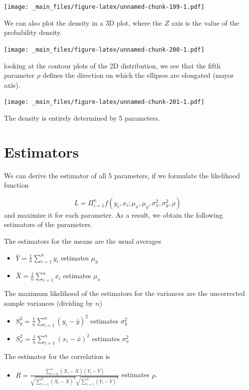 \documentclass[
]{book}
\providecommand{\tightlist}{%
  \setlength{\itemsep}{0pt}\setlength{\parskip}{0pt}}
\begin{document}
\texttt{[image: \_main\_files/figure-latex/unnamed-chunk-199-1.pdf]}

We can also plot the density in a 3D plot, where the \(Z\) axis is the value of the probability density.

\texttt{[image: \_main\_files/figure-latex/unnamed-chunk-200-1.pdf]}

looking at the contour plots of the 2D distribution, we see that the fifth parameter \(\rho\) defines the direction on which the ellipses are elongated (mayor axis).

\texttt{[image: \_main\_files/figure-latex/unnamed-chunk-201-1.pdf]}

The density is entirely determined by 5 parameters.

\hypertarget{estimators}{%
\section{Estimators}\label{estimators}}

We can derive the estimator of all 5 parameters, if we formulate the likelihood function

\[L=\Pi_{i=1}^n f(y_i,x_i; \mu_x, \mu_y, \sigma^2_x, \sigma_y^2, \rho)\]
and maximize it for each parameter. As a result, we obtain the following estimators of the parameters.

The estimators for the means are the usual averages

\begin{itemize}
\tightlist
\item
  \(\bar{Y}=\frac{1}{n}\sum_{i=1}^n y_i\) estimates \(\mu_y\)
\item
  \(\bar{X}=\frac{1}{n}\sum_{i=1}^n x_i\) estimates \(\mu_x\)
\end{itemize}

The maximum likelihood of the estimators for the variances are the uncorrected sample variances (dividing by \(n\))

\begin{itemize}
\tightlist
\item
  \(S^2_y=\frac{1}{n}\sum_{i=1}^n (y_i-\bar{y})^2\) estimates \(\sigma^2_y\)
\item
  \(S^2_x=\frac{1}{n}\sum_{i=1}^n (x_i-\bar{x})^2\) estimates \(\sigma^2_x\)
\end{itemize}

The estimator for the correlation is

\begin{itemize}
\tightlist
\item
  \(R=\frac{\sum_{i=0}^n(X_i-\bar{X})(Y_i-\bar{Y})}{\sqrt{\sum_{i=1}^n(X_i-\bar{X})^2}\sqrt{\sum_{i=1}^n(Y_i-\bar{Y})^2}}\) estimates \(\rho\).
\end{itemize}
\end{document}
